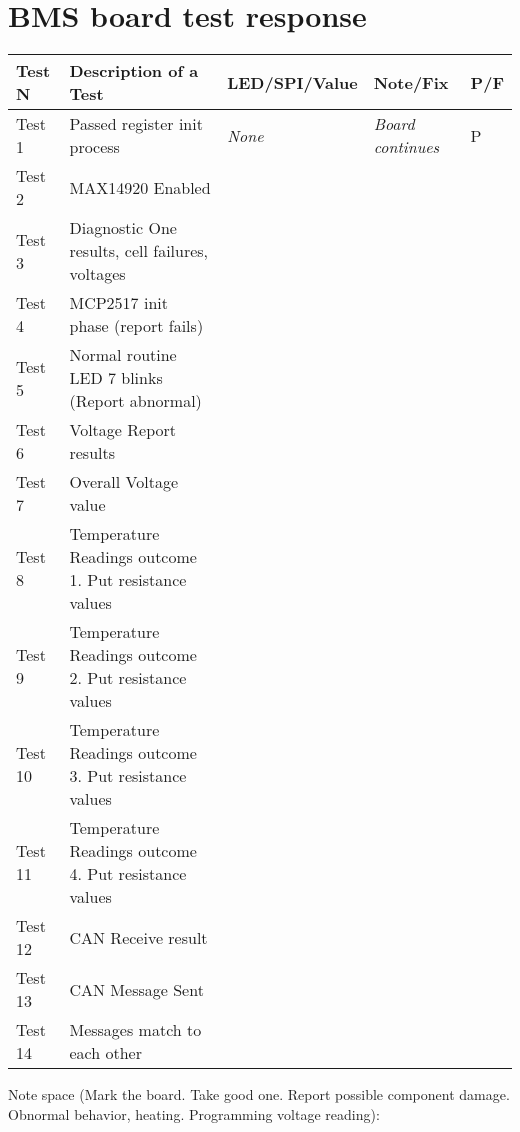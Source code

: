 \documentclass{article}
\begin{document}
\section*{BMS board test response}
\begin{tabular}{ | m{1.3cm} | m{5cm} | m{4cm}| m{6cm}| m{0.6cm} | } 
  \hline
  \textbf{Test N}& \textbf{Description of a Test} & \textbf{LED/SPI/Value} & \textbf{Note/Fix} & \textbf{P/F}  \\ 
  \hline
  Test 1 & Passed register init process & \textit{None} & \textit{Board continues} & P \\ 
  \hline
  Test 2 & MAX14920 Enabled &  & &  \\ 
  \hline
  Test 3 & Diagnostic One results, cell failures, voltages \newline  &  & &  \\ 
  \hline
  Test 4 & MCP2517 init phase (report fails)  \newline  &  & &  \\ 
  \hline
  Test 5 & Normal routine LED 7 blinks (Report abnormal)  \newline  &  & &  \\ 
  \hline
  Test 6 & Voltage Report results  \newline  &  & &  \\ 
  \hline
  Test 7 & Overall Voltage value  \newline  &  & &  \\ 
  \hline
  Test 8 & Temperature Readings outcome 1. Put resistance values  \newline  &  & &  \\ 
  \hline
  Test 9 & Temperature Readings outcome 2. Put resistance values  \newline  &  & &  \\ 
  \hline
  Test 10 & Temperature Readings outcome 3. Put resistance values  \newline  &  & &  \\ 
  \hline
  Test 11 & Temperature Readings outcome 4. Put resistance values  \newline  &  & &  \\ 
  \hline
  Test 12 & CAN Receive result \newline  &  & &  \\ 
  \hline
  Test 13 & CAN Message Sent \newline  &  & &  \\ 
  \hline
  Test 14 & Messages match to each other \newline  &  & &  \\ 
  \hline
  
\end{tabular}
Note space (Mark the board. Take good one. Report possible component damage. Obnormal behavior, heating. Programming voltage reading):
\vspace{1.5cm}
\end{document}
